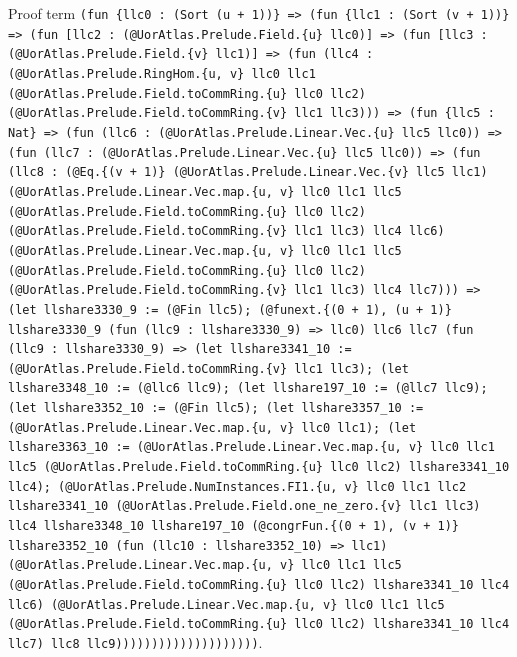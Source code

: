 \documentclass[11pt]{article}
\begin{document}
\noindent Proof term \texttt{(fun \{llc0 : (Sort (u + 1))\} => (fun \{llc1 : (Sort (v + 1))\} => (fun [llc2 : (@UorAtlas.Prelude.Field.\{u\} llc0)] => (fun [llc3 : (@UorAtlas.Prelude.Field.\{v\} llc1)] => (fun (llc4 : (@UorAtlas.Prelude.RingHom.\{u, v\} llc0 llc1 (@UorAtlas.Prelude.Field.toCommRing.\{u\} llc0 llc2) (@UorAtlas.Prelude.Field.toCommRing.\{v\} llc1 llc3))) => (fun \{llc5 : Nat\} => (fun (llc6 : (@UorAtlas.Prelude.Linear.Vec.\{u\} llc5 llc0)) => (fun (llc7 : (@UorAtlas.Prelude.Linear.Vec.\{u\} llc5 llc0)) => (fun (llc8 : (@Eq.\{(v + 1)\} (@UorAtlas.Prelude.Linear.Vec.\{v\} llc5 llc1) (@UorAtlas.Prelude.Linear.Vec.map.\{u, v\} llc0 llc1 llc5 (@UorAtlas.Prelude.Field.toCommRing.\{u\} llc0 llc2) (@UorAtlas.Prelude.Field.toCommRing.\{v\} llc1 llc3) llc4 llc6) (@UorAtlas.Prelude.Linear.Vec.map.\{u, v\} llc0 llc1 llc5 (@UorAtlas.Prelude.Field.toCommRing.\{u\} llc0 llc2) (@UorAtlas.Prelude.Field.toCommRing.\{v\} llc1 llc3) llc4 llc7))) => (let llshare3330\_9 := (@Fin llc5); (@funext.\{(0 + 1), (u + 1)\} llshare3330\_9 (fun (llc9 : llshare3330\_9) => llc0) llc6 llc7 (fun (llc9 : llshare3330\_9) => (let llshare3341\_10 := (@UorAtlas.Prelude.Field.toCommRing.\{v\} llc1 llc3); (let llshare3348\_10 := (@llc6 llc9); (let llshare197\_10 := (@llc7 llc9); (let llshare3352\_10 := (@Fin llc5); (let llshare3357\_10 := (@UorAtlas.Prelude.Linear.Vec.map.\{u, v\} llc0 llc1); (let llshare3363\_10 := (@UorAtlas.Prelude.Linear.Vec.map.\{u, v\} llc0 llc1 llc5 (@UorAtlas.Prelude.Field.toCommRing.\{u\} llc0 llc2) llshare3341\_10 llc4); (@UorAtlas.Prelude.NumInstances.FI1.\{u, v\} llc0 llc1 llc2 llshare3341\_10 (@UorAtlas.Prelude.Field.one\_ne\_zero.\{v\} llc1 llc3) llc4 llshare3348\_10 llshare197\_10 (@congrFun.\{(0 + 1), (v + 1)\} llshare3352\_10 (fun (llc10 : llshare3352\_10) => llc1) (@UorAtlas.Prelude.Linear.Vec.map.\{u, v\} llc0 llc1 llc5 (@UorAtlas.Prelude.Field.toCommRing.\{u\} llc0 llc2) llshare3341\_10 llc4 llc6) (@UorAtlas.Prelude.Linear.Vec.map.\{u, v\} llc0 llc1 llc5 (@UorAtlas.Prelude.Field.toCommRing.\{u\} llc0 llc2) llshare3341\_10 llc4 llc7) llc8 llc9))))))))))))))))))))}.\par
\end{document}
